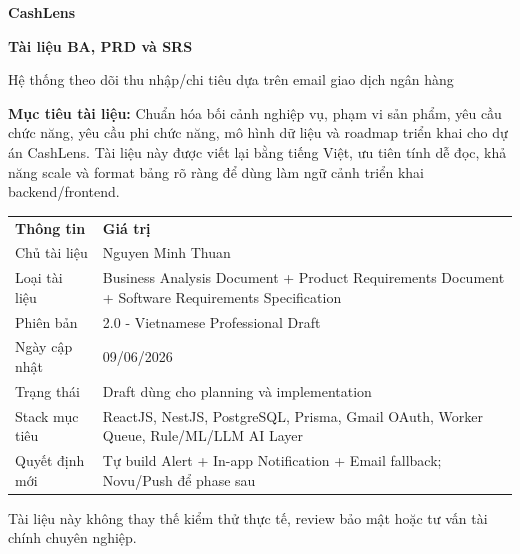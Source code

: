 \documentclass[11pt,a4paper]{article}
\renewcommand{\thead}[1]{\textbf{\color{PrimaryDark}#1}}
\newenvironment{tableblock}{\Needspace{8\baselineskip}\vspace{0.25em}}{\vspace{0.75em}}
\begin{document}
\begin{titlepage}
  \centering
  \vspace*{0.7cm}
  {\Huge\bfseries\color{Primary} CashLens\par}
  \vspace{0.25cm}
  {\Large\bfseries Tài liệu BA, PRD và SRS\par}
  \vspace{0.18cm}
  {\large Hệ thống theo dõi thu nhập/chi tiêu dựa trên email giao dịch ngân hàng\par}
  \vspace{0.85cm}
  \begin{tcolorbox}[width=0.86\textwidth,colback=BoxBg,colframe=Primary,arc=2mm,boxrule=0.8pt]
  \textbf{Mục tiêu tài liệu:} Chuẩn hóa bối cảnh nghiệp vụ, phạm vi sản phẩm, yêu cầu chức năng, yêu cầu phi chức năng, mô hình dữ liệu và roadmap triển khai cho dự án CashLens. Tài liệu này được viết lại bằng tiếng Việt, ưu tiên tính dễ đọc, khả năng scale và format bảng rõ ràng để dùng làm ngữ cảnh triển khai backend/frontend.
  \end{tcolorbox}
  \vfill
  \begin{tableblock}
  \begin{tabular}{L{4.6cm}L{9.1cm}}
  \thead{Thông tin} & \thead{Giá trị} \\
  Chủ tài liệu & Nguyen Minh Thuan \\
  Loại tài liệu & Business Analysis Document + Product Requirements Document + Software Requirements Specification \\
  Phiên bản & 2.0 - Vietnamese Professional Draft \\
  Ngày cập nhật & 09/06/2026 \\
  Trạng thái & Draft dùng cho planning và implementation \\
  Stack mục tiêu & ReactJS, NestJS, PostgreSQL, Prisma, Gmail OAuth, Worker Queue, Rule/ML/LLM AI Layer \\
  Quyết định mới & Tự build Alert + In-app Notification + Email fallback; Novu/Push để phase sau \\
  \end{tabular}
  \end{tableblock}
  \vfill
  {\small \textcolor{Muted}{Tài liệu này không thay thế kiểm thử thực tế, review bảo mật hoặc tư vấn tài chính chuyên nghiệp.}}
\end{titlepage}

\tableofcontents
\newpage
\end{document}
